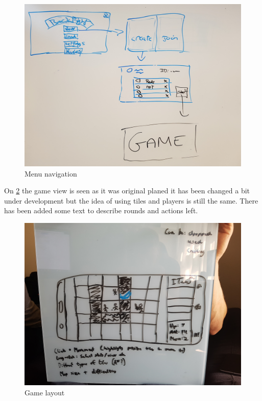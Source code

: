 \begin{figure}
	\centering
	\includegraphics[width=130mm]{images/Gui.png}
	\caption{Menu navigation \label{navigation}}
\end{figure}


On \ref{gameLayout} the game view is seen as it was original planed it has been changed a bit under development but the idea of using tiles and players is still the same. There has been added some text to describe rounds and actions left.

\begin{figure}
	\centering
	\includegraphics[width=130mm]{images/GameView.png}
	\caption{Game layout \label{gameLayout}}
\end{figure}

